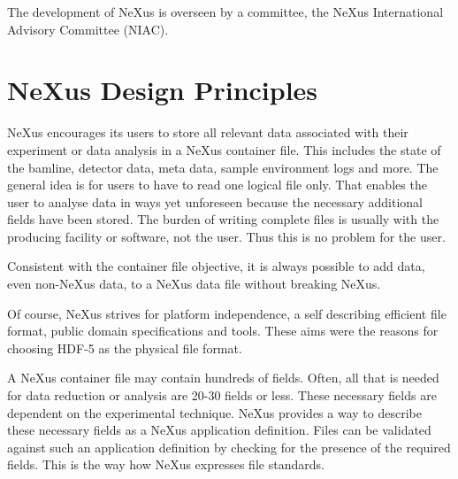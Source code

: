 \documentclass[%
 aip,
rsi,
 amsmath,amssymb,
 reprint,%
]{revtex4-1}
\begin{document}
The development of NeXus is overseen by a committee, the NeXus International Advisory Committee (NIAC).

\section{NeXus Design Principles}


NeXus encourages its users to store all relevant data associated with their experiment or data analysis 
in a NeXus container file. This includes the state of the bamline, detector data, meta data, sample environment 
logs  and more.  The general idea is for users to have to read one logical file only. 
That enables the user to analyse data in ways yet unforeseen because the necessary additional 
fields have been stored. The burden of writing complete files is usually with the producing 
facility or software,  not the user. Thus this is no problem for the user. 

Consistent with the container file objective, it is always possible to add data, even non-NeXus data, 
to a NeXus data file without breaking NeXus. 

Of course, NeXus strives for platform independence, a self describing efficient file format, public 
domain specifications and tools. These aims were the reasons for choosing HDF-5 as the physical file format.

A NeXus container file may contain hundreds of fields. Often, all that is needed for data reduction or analysis are 20-30 
fields or less. These necessary fields are dependent on the experimental technique. NeXus provides a way to 
describe these necessary fields as a NeXus application definition. Files can be validated against such an application definition
by checking for the presence of the required fields. This is the way how NeXus expresses file standards. 
\end{document}
